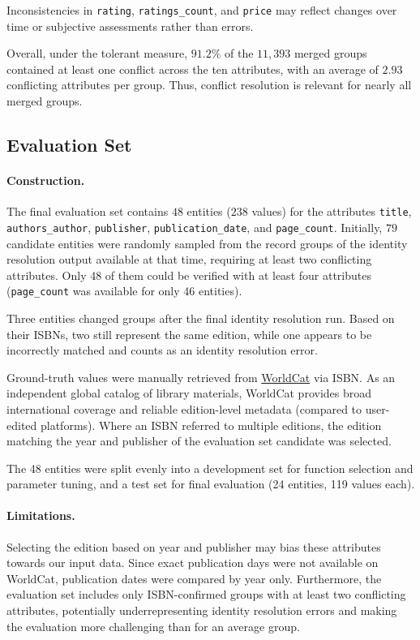 \documentclass[runningheads]{llncs}
\begin{document}
Inconsistencies in \texttt{rating}, \texttt{ratings\_count}, and \texttt{price} may reflect changes over time or subjective assessments rather than errors.

Overall, under the tolerant measure, $91.2\%$ of the $11,393$ merged groups contained at least one conflict across the ten attributes, with an average of $2.93$ conflicting attributes per group.%
Thus, conflict resolution is relevant for nearly all merged groups.


\subsection{Evaluation Set}\label{sec:evalset}

\paragraph{Construction.}
The final evaluation set contains $48$ entities ($238$ values) for the attributes \texttt{title}, \texttt{authors\_author}, \texttt{publisher}, \texttt{publication\_date}, and \texttt{page\_count}. Initially, $79$ candidate entities were randomly sampled from the record groups of the identity resolution output available at that time, requiring at least two conflicting attributes. Only 48 of them could be verified with at least four attributes (\texttt{page\_count} was available for only 46 entities).

Three entities changed groups after the final identity resolution run. Based on their ISBNs, two still represent the same edition, while one appears to be incorrectly matched and counts as an identity resolution error.

Ground-truth values were manually retrieved from \href{https://search.worldcat.org/de}{WorldCat} via ISBN. As an independent global catalog of library materials, WorldCat provides broad international coverage and reliable edition-level metadata (compared to user-edited platforms). Where an ISBN referred to multiple editions, the edition matching the year and publisher of the evaluation set candidate was selected.
 
The 48 entities were split evenly into a development set for function selection and parameter tuning, and a test set for final evaluation (24 entities, 119 values each).

\paragraph{Limitations.}
Selecting the edition based on year and publisher may bias these attributes towards our input data. Since exact publication days were not available on WorldCat, publication dates were compared by year only. Furthermore, the evaluation set includes only ISBN-confirmed groups with at least two conflicting attributes, potentially underrepresenting identity resolution errors and making the evaluation more challenging than for an average group.
\end{document}
